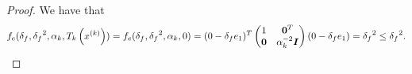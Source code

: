 \begin{proof}
We have that
\begin{align*}
f_e({\delta_{f}}, {\delta_{f}}^2, \alpha_k, T_k\left(x^{(k)}\right) ) =  
f_e({\delta_{f}}, {\delta_{f}}^2, \alpha_k, 0 ) =  
(0 - {\delta_{f}} e_1)^T\begin{pmatrix}
1 & \boldsymbol0^T \\
\boldsymbol 0 & \alpha_k^{-2} \boldsymbol I \\
\end{pmatrix}(0 - {\delta_{f}} e_1) = {\delta_{f}}^2 \le {\delta_{f}}^2.
\end{align*}
\end{proof}








% 
% 
% 
% 


